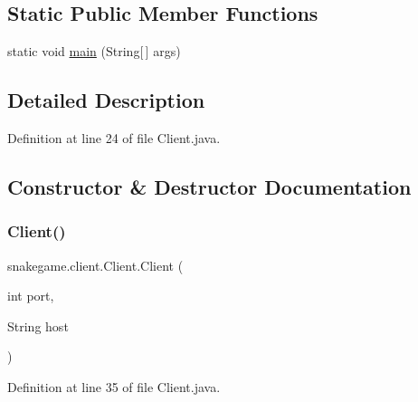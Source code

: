 \subsection*{Static Public Member Functions}
\begin{DoxyCompactItemize}
\item 
static void \mbox{\hyperlink{classsnakegame_1_1client_1_1_client_a0ff707341d32324b30dbb72b4ca90083}{main}} (String\mbox{[}$\,$\mbox{]} args)
\end{DoxyCompactItemize}


\subsection{Detailed Description}


Definition at line 24 of file Client.\+java.



\subsection{Constructor \& Destructor Documentation}
\mbox{\label{classsnakegame_1_1client_1_1_client_a1d9ca3c932bb8594efdfc6facb33d90c}} 
\subsubsection{\texorpdfstring{Client()}{Client()}\hspace{0.1cm}{\footnotesize\ttfamily [1/4]}}
{\footnotesize\ttfamily snakegame.\+client.\+Client.\+Client (\begin{DoxyParamCaption}\item[{int}]{port,  }\item[{String}]{host }\end{DoxyParamCaption})}



Definition at line 35 of file Client.\+java.

\mbox{\label{classsnakegame_1_1client_1_1_client_a535018f1c145ab1ea9949f231b39bd42}} 
